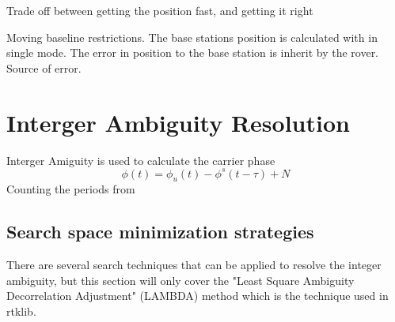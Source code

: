 Trade off between getting the position fast, and getting it right 

Moving baseline restrictions. The base stations position is calculated with in single mode. The error in position to the base station is inherit by the rover. Source of error.
\section{Interger Ambiguity Resolution}
Interger Amiguity is used to calculate the carrier phase
\begin{equation}
\phi(t) = \phi_u(t)-\phi^s(t-\tau)+N
\end{equation}
Counting the periods from 
\subsection{Search space minimization strategies}
There are several search techniques that can be applied to resolve the integer ambiguity, but this section will only cover the "Least Square Ambiguity Decorrelation Adjustment" (LAMBDA) method which is the technique used in rtklib.


\cleardoublepage